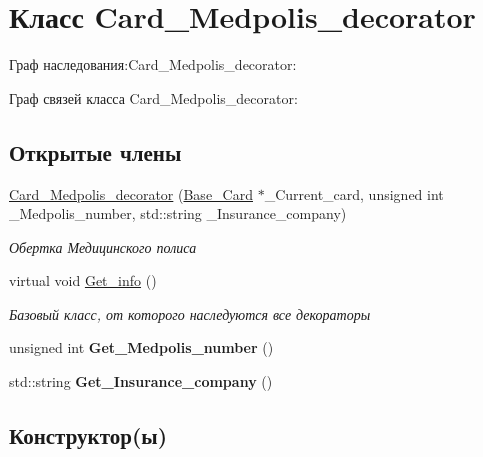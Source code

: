 \hypertarget{classCard__Medpolis__decorator}{}\section{Класс Card\+\_\+\+Medpolis\+\_\+decorator}
\label{classCard__Medpolis__decorator}


Граф наследования\+:Card\+\_\+\+Medpolis\+\_\+decorator\+:


Граф связей класса Card\+\_\+\+Medpolis\+\_\+decorator\+:
\subsection*{Открытые члены}
\begin{DoxyCompactItemize}
\item 
\hyperlink{classCard__Medpolis__decorator_ae379765a088e5bd5b4e431bcb0b236fc}{Card\+\_\+\+Medpolis\+\_\+decorator} (\hyperlink{classBase__Card}{Base\+\_\+\+Card} $\ast$\+\_\+\+Current\+\_\+card, unsigned int \+\_\+\+Medpolis\+\_\+number, std\+::string \+\_\+\+Insurance\+\_\+company)
\begin{DoxyCompactList}\small\item\em Обертка Медицинского полиса \end{DoxyCompactList}\item 
virtual void \hyperlink{classCard__Medpolis__decorator_a86d9b480898388f50768b27261ebbd01}{Get\+\_\+info} ()
\begin{DoxyCompactList}\small\item\em Базовый класс, от которого наследуются все декораторы \end{DoxyCompactList}\item 
unsigned int {\bfseries Get\+\_\+\+Medpolis\+\_\+number} ()\hypertarget{classCard__Medpolis__decorator_a07ab75f7e705323259dfd6f72f13fdc6}{}\label{classCard__Medpolis__decorator_a07ab75f7e705323259dfd6f72f13fdc6}

\item 
std\+::string {\bfseries Get\+\_\+\+Insurance\+\_\+company} ()\hypertarget{classCard__Medpolis__decorator_a91346e89f0fb2be7feade1a0fdfdc4f4}{}\label{classCard__Medpolis__decorator_a91346e89f0fb2be7feade1a0fdfdc4f4}

\end{DoxyCompactItemize}


\subsection{Конструктор(ы)}
